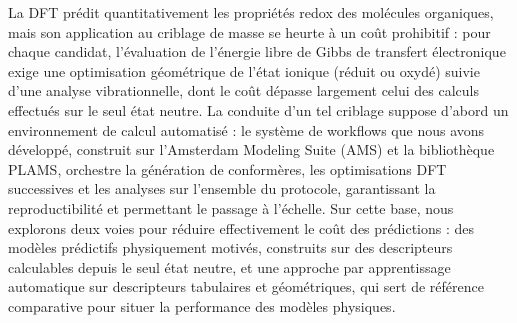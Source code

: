 La DFT prédit quantitativement les propriétés redox des molécules organiques, mais son application au criblage de masse se heurte à un coût prohibitif : pour chaque candidat, l'évaluation de l'énergie libre de Gibbs de transfert électronique exige une optimisation géométrique de l'état ionique (réduit ou oxydé) suivie d'une analyse vibrationnelle, dont le coût dépasse largement celui des calculs effectués sur le seul état neutre. La conduite d'un tel criblage suppose d'abord un environnement de calcul automatisé : le système de workflows que nous avons développé, construit sur l'Amsterdam Modeling Suite (AMS) et la bibliothèque PLAMS, orchestre la génération de conformères, les optimisations DFT successives et les analyses sur l'ensemble du protocole, garantissant la reproductibilité et permettant le passage à l'échelle. Sur cette base, nous explorons deux voies pour réduire effectivement le coût des prédictions : des modèles prédictifs physiquement motivés, construits sur des descripteurs calculables depuis le seul état neutre, et une approche par apprentissage automatique sur descripteurs tabulaires et géométriques, qui sert de référence comparative pour situer la performance des modèles physiques.

